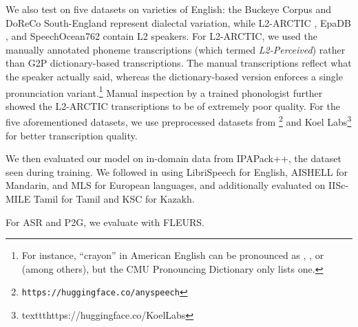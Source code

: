 We also test on five datasets on varieties of English: the Buckeye Corpus \cite{pitt2005buckeye} and DoReCo South-England represent dialectal variation, while L2-ARCTIC \cite{zhao2018l2arctic}, EpaDB \cite{vidal2019epadb}, and SpeechOcean762 \cite{zhang2021speechocean762} contain L2 speakers.
For L2-ARCTIC, we used the manually annotated phoneme transcriptions (which \citet{zhu-etal-2025-zipa} termed \textit{L2-Perceived}) rather than G2P dictionary-based transcriptions.  %
The manual transcriptions reflect what the speaker actually said, whereas the dictionary-based version enforces a single pronunciation variant.\footnote{For instance, ``crayon'' in American English can be pronounced as 
, , or  \citep{vaux2003harvard} (among others), but the CMU Pronouncing Dictionary \citep{rudnicky2003cmu} only lists one.}
Manual inspection by a trained phonologist further showed the L2-ARCTIC transcriptions to be of extremely poor quality.
For the five aforementioned datasets, we use preprocessed datasets from \citet{zhu-etal-2025-zipa}\footnote{\texttt{https://huggingface.co/anyspeech}} and Koel Labs\footnote{texttt{https://huggingface.co/KoelLabs}} for better transcription quality. 

We then evaluated our model on in-domain data from IPAPack++, the dataset seen during training. We followed \citet{zhu-etal-2025-zipa} in using LibriSpeech for English, AISHELL for Mandarin, and MLS for European languages, and additionally evaluated on IISc-MILE Tamil \cite{a2022subworddictionarylearningsegmentation} for Tamil and KSC \cite{khassanov-2021-crowdsourced-ksc} for Kazakh.

For ASR and P2G, we evaluate with FLEURS.

